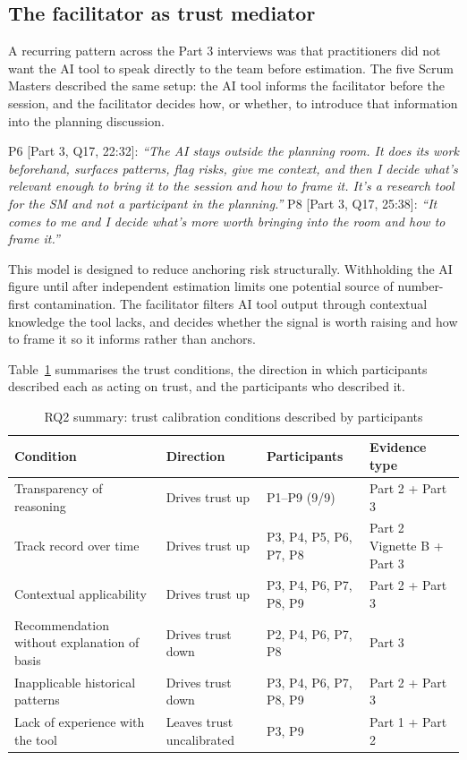 \documentclass[a4paper,twoside]{bth}
\begin{document}
\subsection{The facilitator as trust mediator}

A recurring pattern across the Part 3 interviews was that practitioners did not want the AI tool to speak directly to the team before estimation. The five Scrum Masters described the same setup: the AI tool informs the facilitator before the session, and the facilitator decides how, or whether, to introduce that information into the planning discussion.

P6 [Part 3, Q17, 22:32]: \textit{``The AI stays outside the planning room. It does its work beforehand, surfaces patterns, flag risks, give me context, and then I decide what's relevant enough to bring it to the session and how to frame it. It's a research tool for the SM and not a participant in the planning.''} P8 [Part 3, Q17, 25:38]: \textit{``It comes to me and I decide what's more worth bringing into the room and how to frame it.''}

This model is designed to reduce anchoring risk structurally. Withholding the AI figure until after independent estimation limits one potential source of number-first contamination. The facilitator filters AI tool output through contextual knowledge the tool lacks, and decides whether the signal is worth raising and how to frame it so it informs rather than anchors.

Table~\ref{tab:rq2_summary} summarises the trust conditions, the direction in which participants described each as acting on trust, and the participants who described it.

\begin{table}[htb]
\caption{RQ2 summary: trust calibration conditions described by participants}
\label{tab:rq2_summary}
\centering
\small
\begin{tabular}{p{3.5cm} p{2cm} p{2.6cm} p{3cm}}
\toprule
Condition & Direction & Participants & Evidence type \\
\midrule
Transparency of reasoning & Drives trust up & P1--P9 (9/9) & Part 2 + Part 3 \\
Track record over time & Drives trust up & P3, P4, P5, P6, P7, P8 & Part 2 Vignette B + Part 3 \\
Contextual applicability & Drives trust up & P3, P4, P6, P7, P8, P9 & Part 2 + Part 3 \\
Recommendation without explanation of basis & Drives trust down & P2, P4, P6, P7, P8 & Part 3 \\
Inapplicable historical patterns & Drives trust down & P3, P4, P6, P7, P8, P9 & Part 2 + Part 3 \\
Lack of experience with the tool & Leaves trust uncalibrated & P3, P9 & Part 1 + Part 2 \\
\bottomrule
\end{tabular}
\end{table}
\end{document}

